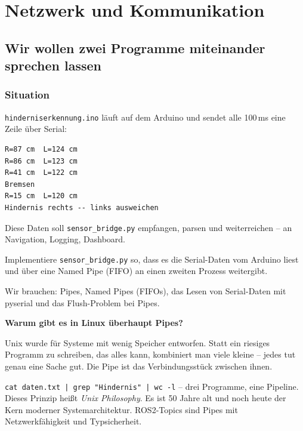 \part{Netzwerk und Kommunikation}

\chapter{Wir wollen zwei Programme miteinander sprechen lassen}

\kapitelstruktur

\section{Situation}

\texttt{hinderniserkennung.ino} läuft auf dem Arduino und
sendet alle 100\,ms eine Zeile über Serial:

\begin{lstlisting}[style=text]
R=87 cm  L=124 cm
R=86 cm  L=123 cm
R=41 cm  L=122 cm
Bremsen
R=15 cm  L=120 cm
Hindernis rechts -- links ausweichen
\end{lstlisting}

Diese Daten soll \texttt{sensor\_bridge.py} empfangen,
parsen und weiterreichen -- an Navigation, Logging, Dashboard.

\begin{aufgabeBox}
Implementiere \texttt{sensor\_bridge.py} so, dass es
die Serial-Daten vom Arduino liest und über eine Named Pipe
(FIFO) an einen zweiten Prozess weitergibt.
\end{aufgabeBox}

\begin{wissenBox}
Wir brauchen: Pipes, Named Pipes (FIFOs), das Lesen von
Serial-Daten mit pyserial und das Flush-Problem bei Pipes.
\end{wissenBox}

\begin{haubeBox}
\textbf{Warum gibt es in Linux überhaupt Pipes?}

Unix wurde für Systeme mit wenig Speicher entworfen.
Statt ein riesiges Programm zu schreiben, das alles kann,
kombiniert man viele kleine -- jedes tut genau eine Sache gut.
Die Pipe ist das Verbindungsstück zwischen ihnen.

\texttt{cat daten.txt | grep "Hindernis" | wc -l}
-- drei Programme, eine Pipeline. Dieses Prinzip heißt
\textit{Unix Philosophy}. Es ist 50 Jahre alt und noch
heute der Kern moderner Systemarchitektur.
ROS2-Topics sind Pipes mit Netzwerkfähigkeit und Typsicherheit.
\end{haubeBox}

